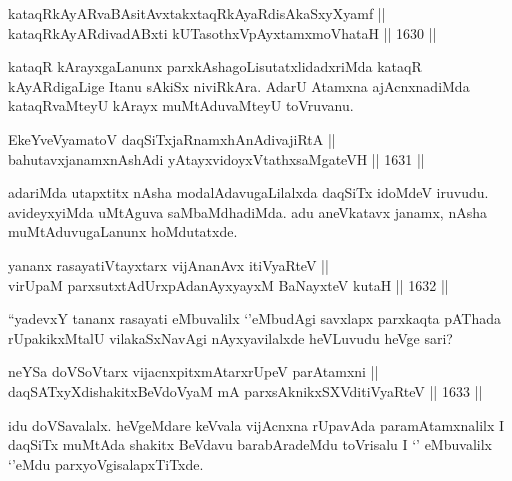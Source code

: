 
\begin{shl}
kataqRkAyARvaBAsitAvxtakxtaqRkAyaRdisAkaSxyXyamf || \\
kataqRkAyARdivadABxti kUTasothxV\s pAyxtamxmoVhataH ||  1630 ||  
\end{shl}

\begin{artha}
kataqR kArayxgaLanunx parxkAshagoLisutatxlidadxriMda kataqR kAyARdigaLige Itanu sAkiSx niviRkAra. AdarU Atamxna ajAcnxnadiMda kataqRvaMteyU kArayx muMtAduvaMteyU toVruvanu.
\end{artha}

\begin{shl}
EkeYveVyamatoV daqSiTxjaRnamxhAnAdivajiRtA || \\
bahutavxjanamxnAshAdi yAtayxvidoyxVtathxsaMgateVH ||  1631 ||  
\end{shl}

\begin{artha}
adariMda utapxtitx nAsha modalAdavugaLilalxda daqSiTx idoMdeV iruvudu. avideyxyiMda uMtAguva saMbaMdhadiMda. adu aneVkatavx janamx, nAsha muMtAduvugaLanunx hoMdutatxde.
\end{artha}


\begin{shl}
yananx rasayatiVtayxtarx vijAnanAvx itiVyaRteV || \\
virUpaM parxsutxtAdUrxpAdanAyxyayxM BaNayxteV kutaH ||  1632 ||  
\end{shl}

\begin{artha}
``yadevxY tananx rasayati eMbuvalilx `\stext'eMbudAgi savxlapx parxkaqta pAThada rUpakikxMtalU vilakaSxNavAgi nAyxyavilalxde heVLuvudu heVge sari?
\end{artha}

\begin{shl}
neYSa doVSoV\s tarx vijacnxpitxmAtarxrUpeV parAtamxni || \\
daqSATxyXdishakitxBeVdoV\s yaM mA parxsAknikxSXVditiVyaRteV ||  1633 ||  
\end{shl}

\begin{artha}
idu doVSavalalx. heVgeMdare keVvala vijAcnxna rUpavAda paramAtamxnalilx I daqSiTx muMtAda shakitx BeVdavu barabAradeMdu toVrisalu I `\stext' eMbuvalilx `\stext'eMdu parxyoVgisalapxTiTxde.
\end{artha}

